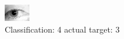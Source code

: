 \begin{figure}[h!]
\begin{center}
\includegraphics[width=0.60\columnwidth]{figures/ID1255_class_4_target_3.png}
\end{center}
\caption{ Classification: 4 actual target: 3}
\label{fig:ID1255_class_4_target_3}
\end{figure}
